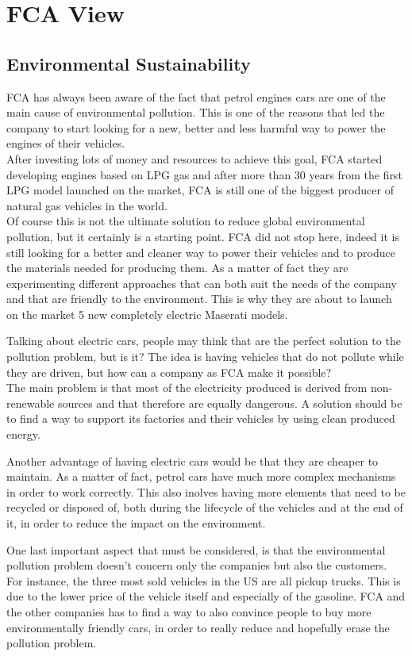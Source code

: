 \section{FCA View}
\subsection{Environmental Sustainability}
FCA has always been aware of the fact that petrol engines cars are one of the main cause of environmental pollution. This is one of the reasons that led the company to start looking for a new, better and less harmful way to power the engines of their vehicles.\\
After investing lots of money and resources to achieve this goal, FCA started developing engines based on LPG gas and after more than 30 years from the first LPG model launched on the market, FCA is still one of the biggest producer of natural gas vehicles in the world\cite{FCA_sustainability}.\\
Of course this is not the ultimate solution to reduce global environmental pollution, but it certainly is a starting point. FCA did not stop here, indeed it is still looking for a better and cleaner way to power their vehicles and to produce the materials needed for producing them. As a matter of fact they are experimenting different approaches that can both suit the needs of the company and that are friendly to the environment. This is why they are about to launch on the market 5 new completely electric Maserati models\cite{Maserati_electric}.

Talking about electric cars, people may think that are the perfect solution to the pollution problem, but is it?
The idea is having vehicles that do not pollute while they are driven, but how can a company as FCA make it possible?\\
The main problem is that most of the electricity produced is derived from non-renewable sources and that therefore are equally dangerous. A solution should be to find a way to support its factories and their vehicles by using clean produced energy.

Another advantage of having electric cars would be that they are cheaper to maintain. As a matter of fact, petrol cars have much more complex mechanisms in order to work correctly. This also inolves having more elements that need to be recycled or disposed of, both during the lifecycle of the vehicles and at the end of it, in order to reduce the impact on the environment.

One last important aspect that must be considered, is that the environmental pollution problem doesn't concern only the companies but also the customers. For instance, the three most sold vehicles in the US are all pickup trucks\cite{US_best-selling-vehicle}. This is due to the lower price of the vehicle itself and especially of the gasoline. 
FCA and the other companies has to find a way to also convince people to buy more environmentally friendly cars, in order to really reduce and hopefully erase the pollution problem.

